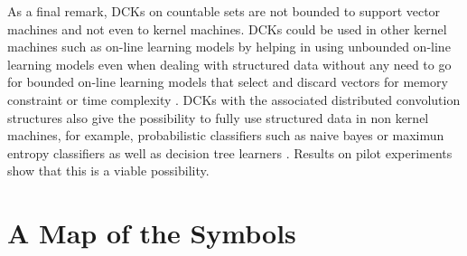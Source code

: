 \documentclass[twoside,11pt]{article}
\def\comment#1#2{}
\begin{document}
As a final remark, DCKs on countable sets are not bounded to support vector machines and not even to kernel machines. DCKs could be used in other kernel machines such as on-line learning models by helping in using unbounded on-line learning models \cite{Cavallanti:2007:TBH:1296038.1296052} even when dealing with structured data without any need to go for bounded on-line learning models that select and discard vectors for memory constraint or time complexity \cite{Cavallanti:2007:TBH:1296038.1296052,DBLP:conf/nips/DekelSS05,Orabona:2008:PBK:1390156.1390247}.  
DCKs with the associated distributed convolution structures also give the possibility to fully use structured data in non kernel machines, for example, probabilistic classifiers such as naive bayes or maximun entropy classifiers as well as decision tree learners \cite{Quinlan:1993}. \comment{R3, C1}{do you mean "(Quinlan '93) can NOW use tree structured data."?} Results on pilot experiments show that this is a viable possibility.

\newpage


\appendix 
\section{A Map of the Symbols\comment{NEW}{}}
\label{section:symbols}
\end{document}
